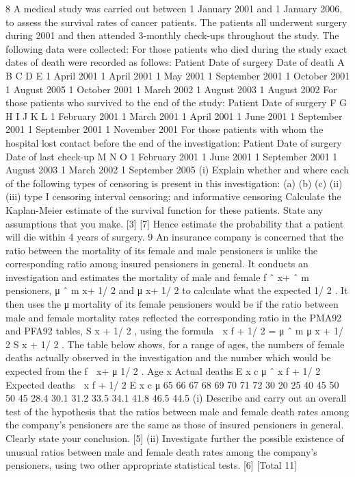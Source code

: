 \documentclass[a4paper,12pt]{article}
\begin{document}
\begin{enumerate}

8
A medical study was carried out between 1 January 2001 and 1 January 2006, to
assess the survival rates of cancer patients. The patients all underwent surgery during
2001 and then attended 3-monthly check-ups throughout the study.
The following data were collected:
For those patients who died during the study exact dates of death were recorded as
follows:
Patient Date of surgery Date of death
A
B
C
D
E 1 April 2001
1 April 2001
1 May 2001
1 September 2001
1 October 2001 1 August 2005
1 October 2001
1 March 2002
1 August 2003
1 August 2002
For those patients who survived to the end of the study:
Patient Date of surgery
F
G
H
I
J
K
L 1 February 2001
1 March 2001
1 April 2001
1 June 2001
1 September 2001
1 September 2001
1 November 2001
For those patients with whom the hospital lost contact before the end of the
investigation:
Patient Date of surgery Date of last check-up
M
N
O 1 February 2001
1 June 2001
1 September 2001 1 August 2003
1 March 2002
1 September 2005
(i)
Explain whether and where each of the following types of censoring is present
in this investigation:
(a)
(b)
(c)
(ii)
(iii)
type I censoring
interval censoring; and
informative censoring
Calculate the Kaplan-Meier estimate of the survival function for these
patients. State any assumptions that you make.
[3]
[7]
Hence estimate the probability that a patient will die within 4 years of surgery.
9
An insurance company is concerned that the ratio between the mortality of its female
and male pensioners is unlike the corresponding ratio among insured pensioners in
general. It conducts an investigation and estimates the mortality of male and female
f
ˆ x+
ˆ m
pensioners, μ ˆ m
x+ 1/ 2 and μ
x+ 1/ 2 to calculate what the expected
1/ 2 . It then uses the μ
mortality of its female pensioners would be if the ratio between male and female
mortality rates reflected the corresponding ratio in the PMA92 and PFA92 tables,
S x + 1/ 2 , using the formula
 x f + 1/ 2 = μ ˆ m
μ
x + 1/ 2 S x + 1/ 2 .
The table below shows, for a range of ages, the numbers of female deaths actually
observed in the investigation and the number which would be expected from the
f
 x+
μ
1/ 2 .
Age
x Actual deaths
E x c μ ˆ x f + 1/ 2 Expected deaths
 x f + 1/ 2
E x c μ
65
66
67
68
69
70
71
72 30
20
25
40
45
50
50
45 28.4
30.1
31.2
33.5
34.1
41.8
46.5
44.5
(i) Describe and carry out an overall test of the hypothesis that the ratios between
male and female death rates among the company’s pensioners are the same as
those of insured pensioners in general. Clearly state your conclusion.
[5]
(ii) Investigate further the possible existence of unusual ratios between male and
female death rates among the company’s pensioners, using two other
appropriate statistical tests.
[6]
[Total 11]


\end{enumerate}
\end{document}
